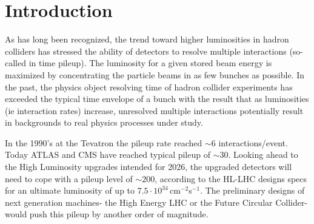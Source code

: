 \documentclass{article}
\begin{document}
\begin{abstract}

\end{abstract}

\clearpage

\tableofcontents

\section{Introduction}

As has long been recognized, the trend toward higher luminosities in hadron colliders has stressed the ability of detectors to resolve multiple interactions (so-called in time pileup). The luminosity for a given stored beam energy is maximized by concentrating the particle beams in as few bunches as possible. In the past, the physics object resolving time of hadron collider experiments has exceeded the typical time envelope of a bunch with the result that
as luminosities (ie interaction rates) increase, unresolved multiple interactions potentially result in backgrounds to real physics processes under study.

In the 1990's at the Tevatron the pileup rate reached $\sim6$ interactions/event. Today ATLAS and CMS have reached typical pileup of $\sim30$. Looking ahead to the High Luminosity upgrades intended for 2026, the upgraded detectors will need to cope with a pileup level of $\sim200$, according to the HL-LHC designs specs for an ultimate luminosity of up to $7.5 \cdot 10^{34}$\,cm$^{-2}$s$^{-1}$. The preliminary designs of next generation machines- the High Energy LHC or the Future Circular Collider- would push this pileup by another order of magnitude.
\end{document}
